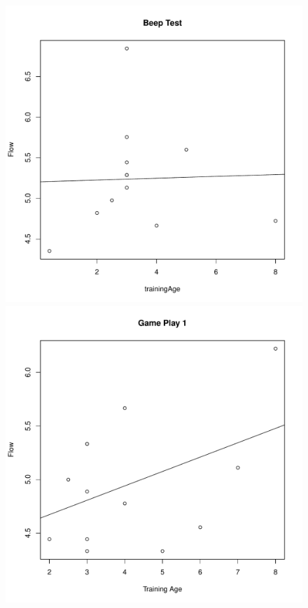 \begin{CJK}{UTF8}{gbsn}
\begin{figure}[htbp]
  \centering
\includegraphics[scale=.2]{images/beepFlowTrainingAge.pdf}
\includegraphics[scale=.2]{images/flow0109TrainingAge.pdf}

\end{figure}
\end{CJK}
